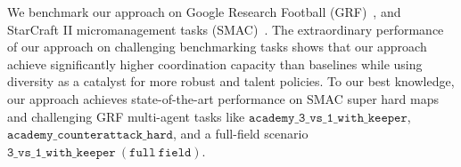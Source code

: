 We benchmark our approach on Google Research Football (GRF)~\cite{kurach2020google}, and StarCraft II micromanagement tasks (SMAC)~\cite{samvelyan2019starcraft}. The extraordinary performance of our approach on challenging benchmarking tasks shows that our approach achieve significantly higher coordination capacity than baselines while using diversity as a catalyst for more robust and talent policies. To our best knowledge, our approach achieves state-of-the-art performance on SMAC super hard maps and challenging GRF multi-agent tasks like $\mathtt{academy\_3\_vs\_1\_with\_keeper}$, $\mathtt{academy\_counterattack\_hard}$, and a full-field scenario $\mathtt{3\_vs\_1\_with\_keeper\ (full\ field)}$.


